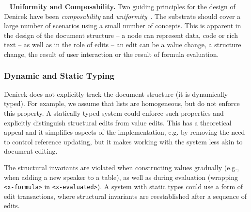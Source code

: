\documentclass[sigconf,anonymous,screen]{acmart}
\newcommand{\ident}[1]{{\sffamily #1}}
\DeclareRobustCommand{\keyideabox}[3]{\begin{tcolorbox}[breakable,
  boxsep=5pt,left=0pt,right=0pt,top=0pt,bottom=0pt,width=\dimexpr\columnwidth\relax,
  colback=gray!20,colframe=gray!20,
  enlarge bottom by=0pt,enlarge top by=0pt,
  arc=0pt,outer arc=0pt]
\lettrine[lraise=0.3]{\LARGE #1}{~}
\small \textbf{#2.} #3
\end{tcolorbox}
}
\begin{document}
\keyideabox{\faCubes}{Uniformity and Composability}{
Two guiding principles for the design of Denicek have been \emph{composability} and
\emph{uniformity}~\cite{jakubovic-2023-techdims}. The substrate should cover a large number of
scenarios using a small number of concepts. This is apparent in the design of the document
structure -- a node can represent data, code or rich text -- as well as in the role of
edits -- an edit can be a value change, a structure change, the result of user interaction
or the result of formula evaluation.
}


\subsubsection*{Dynamic and Static Typing}
Denicek does not explicitly track the document structure (it is dynamically typed). For example, we
assume that lists are homogeneous, but do not enforce this property. A statically typed system could
enforce such properties and explicitly distinguish structural edits from value edits. This has a
theoretical appeal and it simplifies aspects of the implementation, e.g. by removing the need to
control reference updating, but it makes working with the system less akin to document editing.

The structural invariants are violated when constructing values gradually (e.g., when adding a new
speaker to a table), as well as during evaluation (wrapping {\small\Verb_<x-formula>_}
in {\small\Verb_<x-evaluated>_}). A system with static types could use a form of edit
transactions, where structural invariants are reestablished after a sequence of edits.

%
\end{document}
